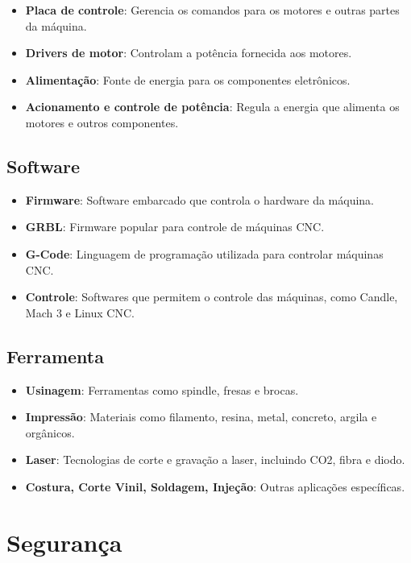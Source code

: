 \documentclass[
]{book}
\providecommand{\tightlist}{%
  \setlength{\itemsep}{0pt}\setlength{\parskip}{0pt}}
\begin{document}
\begin{itemize}
\tightlist
\item
  \textbf{Placa de controle}: Gerencia os comandos para os motores e outras partes da máquina.
\item
  \textbf{Drivers de motor}: Controlam a potência fornecida aos motores.
\item
  \textbf{Alimentação}: Fonte de energia para os componentes eletrônicos.
\item
  \textbf{Acionamento e controle de potência}: Regula a energia que alimenta os motores e outros componentes.
\end{itemize}

\subsection{Software}\label{software}

\begin{itemize}
\tightlist
\item
  \textbf{Firmware}: Software embarcado que controla o hardware da máquina.
\item
  \textbf{GRBL}: Firmware popular para controle de máquinas CNC.
\item
  \textbf{G-Code}: Linguagem de programação utilizada para controlar máquinas CNC.
\item
  \textbf{Controle}: Softwares que permitem o controle das máquinas, como Candle, Mach 3 e Linux CNC.
\end{itemize}

\subsection{Ferramenta}\label{ferramenta}

\begin{itemize}
\tightlist
\item
  \textbf{Usinagem}: Ferramentas como spindle, fresas e brocas.
\item
  \textbf{Impressão}: Materiais como filamento, resina, metal, concreto, argila e orgânicos.
\item
  \textbf{Laser}: Tecnologias de corte e gravação a laser, incluindo CO2, fibra e diodo.
\item
  \textbf{Costura, Corte Vinil, Soldagem, Injeção}: Outras aplicações específicas.
\end{itemize}

\section{Segurança}\label{seguranuxe7a}
\end{document}
